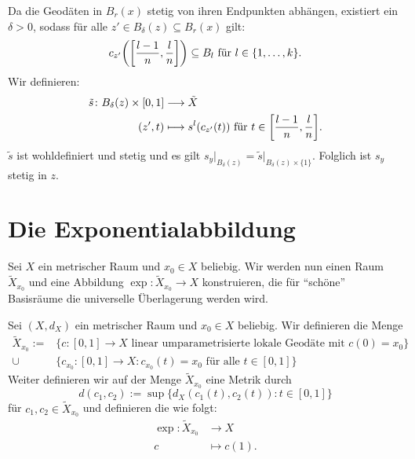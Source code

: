 \begin{beweis}
\begin{itemize}
\begin{figure}[h]
		\end{figure}
		
		Da die Geodäten in $B_r(x)$ stetig von ihren Endpunkten abhängen, existiert ein $\delta > 0$, sodass für alle $z' \in B_\delta(z) \subseteq B_r(x)$ gilt:
		\[
			c_{z'} \enbrace*{\benbrace*{\frac{l-1}{n},\frac{l}{n}}} \subseteq B_l \text{ für } l \in \{1,\dots,k\}.
		\]
		Wir definieren:
		\begin{align*}
			\tilde{s}\colon B_\delta(z) \times [0,1] &\longrightarrow \tilde{X} \\
			(z',t) &\longmapsto s^l(c_{z'}(t)) \text{ für } t \in \benbrace*{\frac{l-1}{n},\frac{l}{n}}.
		\end{align*}
		$\tilde{s}$ ist wohldefiniert und stetig und es gilt $s_y \big|_{B_\delta(z)} = \tilde{s} \big|_{B_\delta(z) \times \{1\}}$.
		Folglich ist $s_y$ stetig in $z$. \qedhere	
	\end{itemize}
\end{beweis}

\section{Die Exponentialabbildung}
\label{sec:2.3}
	Sei $X$ ein metrischer Raum und $x_0 \in X$ beliebig. 
	Wir werden nun einen Raum $\tilde{X}_{x_0}$ und eine Abbildung $\exp\colon \tilde{X}_{x_0} \rightarrow X$ konstruieren, die für \enquote{schöne} Basisräume die universelle Überlagerung werden wird.
	
\begin{definition}[Exponentialabbildung]
\label{def:2.29}
	Sei $(X,d_X)$ ein metrischer Raum und $x_0 \in X$ beliebig.
	Wir definieren die Menge
	\begin{align*}
		\tilde{X}_{x_0} := &\{c \colon [0,1] \rightarrow X \text{ linear umparametrisierte lokale Geodäte mit } c(0) = x_0\} \\
		\cup &\{c_{x_0} \colon [0,1] \rightarrow X : c_{x_0}(t) = x_0 \text{ für alle } t \in [0,1]\}
	\end{align*}
	Weiter definieren wir auf der Menge $\tilde{X}_{x_0}$ eine Metrik durch
	\[
		d(c_1,c_2) := \sup \{ d_X(c_1(t),c_2(t)) : t \in [0,1]\}
	\]
	für $c_1,c_2 \in \tilde{X}_{x_0}$ und definieren die  wie folgt:
	\begin{align*}
		\exp\colon \tilde{X}_{x_0} &\longrightarrow X \\
		c &\longmapsto c(1).
	\end{align*}
\end{definition}	
	
